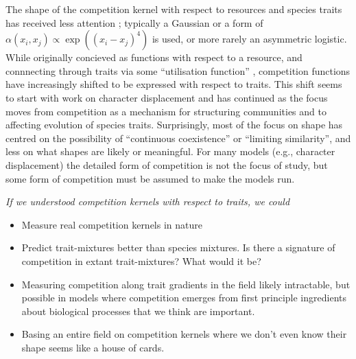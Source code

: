 \documentclass[a4paper,11pt]{article}
\begin{document}
%
The shape of the competition kernel with respect to resources and
species traits has received less attention \citep[but
see][]{Abrams-2008,Leimar-2013}; typically a Gaussian or a form of
$\alpha(x_i, x_j) \propto \exp((x_i - x_j)^4)$ is used, or more rarely
an asymmetric logistic.
%
While originally concieved as functions with respect to a resource,
and connnecting through traits via some ``utilisation function''
\citep{MacArthur-1967}, competition functions have increasingly
shifted to be expressed with respect to traits.
%
This shift seems to start with work on character displacement
\citep{Taper-1985} and has continued as the focus moves from
competition as a mechanism for structuring communities and to
affecting evolution of species traits.
%
Surprisingly, most of the focus on shape has centred on the
possibility of ``continuous coexistence'' or ``limiting similarity'',
and less on what shapes are likely or meaningful.
For many models (e.g., character displacement) the detailed form of
competition is not the focus of study, but some form of competition
must be assumed to make the models run.
%


\textit{If we understood competition kernels with respect to traits,
  we could}
\begin{itemize}
\item Measure real competition kernels in nature
\item Predict trait-mixtures better than species mixtures.  Is there a
  signature of competition in extant trait-mixtures?  What would it
  be?
\item Measuring competition along trait gradients in the field likely
  intractable, but possible in models where competition emerges from
  first principle ingredients about biological processes that we think
  are important.
\item Basing an entire field on competition kernels where we don't
  even know their shape seems like a house of cards.
\end{itemize}
\end{document}
